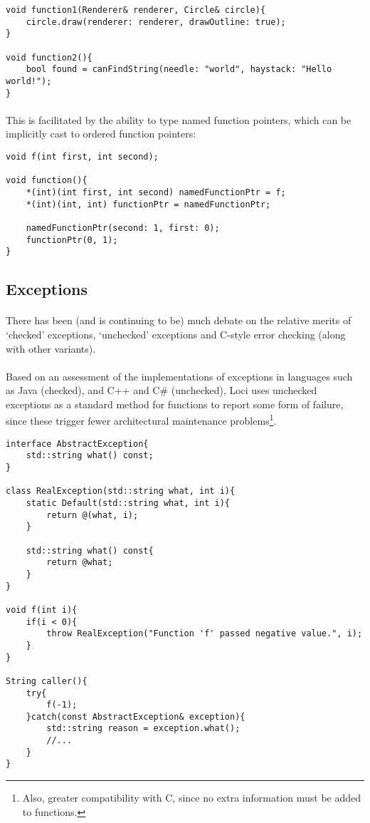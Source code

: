 \documentclass[12pt,twoside,notitlepage]{report}
\begin{document}
\begin{lstlisting}
void function1(Renderer& renderer, Circle& circle){
	circle.draw(renderer: renderer, drawOutline: true);
}

void function2(){
	bool found = canFindString(needle: "world", haystack: "Hello world!");
}
\end{lstlisting}


\paragraph{}
This is facilitated by the ability to type named function pointers, which can be implicitly cast to ordered function pointers:


\begin{lstlisting}
void f(int first, int second);

void function(){
	*(int)(int first, int second) namedFunctionPtr = f;
	*(int)(int, int) functionPtr = namedFunctionPtr;
	
	namedFunctionPtr(second: 1, first: 0);
	functionPtr(0, 1);
}
\end{lstlisting}


\clearpage

\subsection{Exceptions}

\paragraph{}
There has been (and is continuing to be) much debate on the relative merits of `checked' exceptions, `unchecked' exceptions and C-style error checking (along with other variants).

\paragraph{}
Based on an assessment of the implementations of exceptions in languages such as Java (checked), and C++ and C\# (unchecked), Loci uses unchecked exceptions as a standard method for functions to report some form of failure, since these trigger fewer architectural maintenance problems\footnote{Also, greater compatibility with C, since no extra information must be added to functions.}.


\begin{lstlisting}
interface AbstractException{
	std::string what() const;
}

class RealException(std::string what, int i){
	static Default(std::string what, int i){
		return @(what, i);
	}

	std::string what() const{
		return @what;
	}
}

void f(int i){
	if(i < 0){
		throw RealException("Function 'f' passed negative value.", i);
	}
}

String caller(){
	try{
		f(-1);
	}catch(const AbstractException& exception){
		std::string reason = exception.what();
		//...
	}
}
\end{lstlisting}
\end{document}
